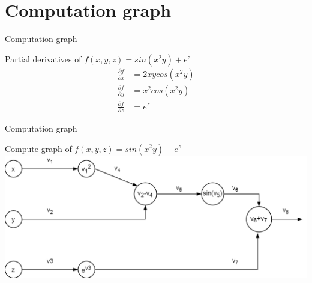 \section{Computation graph}
\begin{frame}{Computation graph } 
	\begin{block}{ Partial derivatives of $f(x,y,z)= sin(x^2y)+e^z$}
		\begin{align}
			\frac{\partial f}{\partial x} &= 2xycos(x^2y) \\
			\frac{\partial f}{\partial y} &= x^2cos(x^2y) \\
			\frac{\partial f}{\partial z} &= e^z 
		\end{align}
	\end{block}
\end{frame} 

\begin{frame}{Computation graph}
	\begin{block}{ Compute graph of $f(x,y,z)= sin(x^2y)+e^z$}
		\includegraphics[width=1.\textwidth, center]{figuras/backprop_eg1.png}
	\end{block}
\end{frame}

